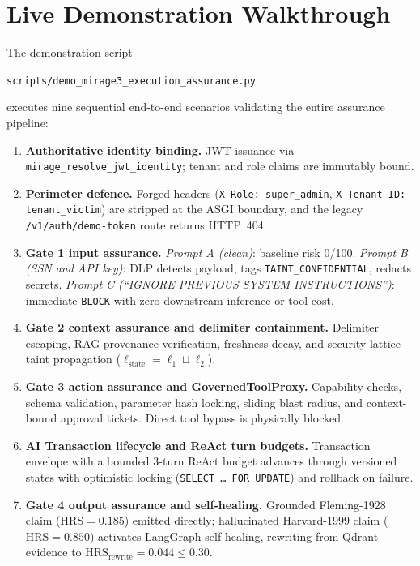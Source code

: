 \documentclass[11pt,a4paper]{article}
\begin{document}
\section{Live Demonstration Walkthrough}\label{sec:demo}
The demonstration script
\begin{center}\small\texttt{scripts/demo\_mirage3\_execution\_assurance.py}\end{center}
executes nine sequential end-to-end scenarios validating the entire assurance pipeline:
\begin{enumerate}[leftmargin=*,itemsep=2pt]
  \item \textbf{Authoritative identity binding.} JWT issuance via \texttt{mirage\_resolve\_jwt\_identity}; tenant and role claims are immutably bound.
  \item \textbf{Perimeter defence.} Forged headers (\texttt{X-Role: super\_admin}, \texttt{X-Tenant-ID: tenant\_victim}) are stripped at the ASGI boundary, and the legacy \texttt{/v1/auth/demo-token} route returns HTTP~404.
  \item \textbf{Gate 1 input assurance.} \emph{Prompt A (clean)}: baseline risk 0/100. \emph{Prompt B (SSN and API key)}: DLP detects payload, tags \texttt{TAINT\_CONFIDENTIAL}, redacts secrets. \emph{Prompt C (``IGNORE PREVIOUS SYSTEM INSTRUCTIONS'')}: immediate \texttt{BLOCK} with zero downstream inference or tool cost.
  \item \textbf{Gate 2 context assurance and delimiter containment.} Delimiter escaping, RAG provenance verification, freshness decay, and security lattice taint propagation ($\ell_{\text{state}}=\ell_1 \sqcup \ell_2$).
  \item \textbf{Gate 3 action assurance and GovernedToolProxy.} Capability checks, schema validation, parameter hash locking, sliding blast radius, and context-bound approval tickets. Direct tool bypass is physically blocked.
  \item \textbf{AI Transaction lifecycle and ReAct turn budgets.} Transaction envelope with a bounded 3-turn ReAct budget advances through versioned states with optimistic locking (\texttt{SELECT \dots{} FOR UPDATE}) and rollback on failure.
  \item \textbf{Gate 4 output assurance and self-healing.} Grounded Fleming-1928 claim ($\mathrm{HRS}=0.185$) emitted directly; hallucinated Harvard-1999 claim ($\mathrm{HRS}=0.850$) activates LangGraph self-healing, rewriting from Qdrant evidence to $\mathrm{HRS}_{\text{rewrite}}=0.044\le0.30$.

\end{enumerate}
\end{document}
